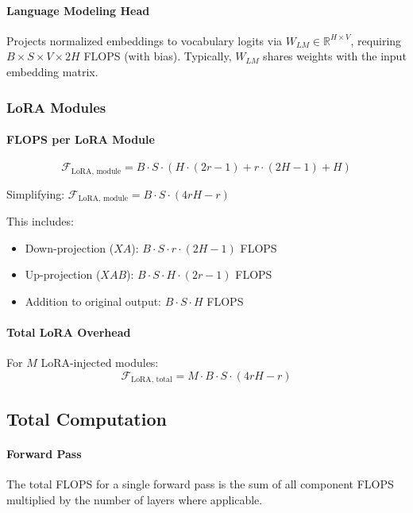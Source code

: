 \documentclass[11pt]{article}
\begin{document}
\paragraph{Language Modeling Head}
Projects normalized embeddings to vocabulary logits via $W_{LM} \in \mathbb{R}^{H \times V}$, requiring $B \times S \times V \times 2H$ FLOPS (with bias). Typically, $W_{LM}$ shares weights with the input embedding matrix.

\subsubsection{LoRA Modules}
\paragraph{FLOPS per LoRA Module}
\begin{equation}
\mathcal{F}_{\text{LoRA, module}} = B \cdot S \cdot (H \cdot (2r - 1) + r \cdot (2H - 1) + H)
\end{equation}

Simplifying: $\mathcal{F}_{\text{LoRA, module}} = B \cdot S \cdot (4rH - r)$

This includes:
\begin{itemize}
    \item Down-projection ($XA$): $B \cdot S \cdot r \cdot (2H - 1)$ FLOPS
    \item Up-projection ($XAB$): $B \cdot S \cdot H \cdot (2r - 1)$ FLOPS
    \item Addition to original output: $B \cdot S \cdot H$ FLOPS
\end{itemize}

\paragraph{Total LoRA Overhead}
For $M$ LoRA-injected modules:
\begin{equation}
\mathcal{F}_{\text{LoRA, total}} = M \cdot B \cdot S \cdot (4rH - r)
\end{equation}


\subsection{Total Computation}

\paragraph{Forward Pass}
The total FLOPS for a single forward pass is the sum of all component FLOPS multiplied by the number of layers where applicable.
\end{document}
